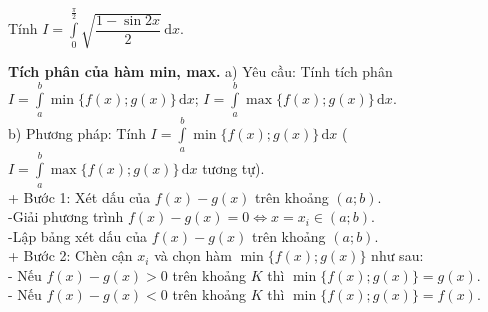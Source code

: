 \begin{ex}%
	Tính $I=\displaystyle\int\limits_0^{\tfrac{\pi}{2}}\sqrt{\dfrac{1-\sin 2x}{2}}\mathrm{\,d}x$.
\end{ex}
\textbf{Tích phân của hàm min, max.}
a) Yêu cầu: Tính tích phân $I=\displaystyle\int\limits_a^b\min\{f(x);g(x)\}\mathrm{\,d}x$; $I=\displaystyle\int\limits_a^b\max\{f(x);g(x)\}\mathrm{\,d}x$.\\
b) Phương pháp: Tính $I=\displaystyle\int\limits_a^b\min\{f(x);g(x)\}\mathrm{\,d}x$ ($I=\displaystyle\int\limits_a^b\max\{f(x);g(x)\}\mathrm{\,d}x$ tương tự).\\
+ Bước 1: Xét dấu của $f(x)-g(x)$ trên khoảng $(a;b)$.\\
-Giải phương trình $f(x)-g(x)=0\Leftrightarrow x=x_i\in(a;b)$.\\
-Lập bảng xét dấu của $f(x)-g(x)$ trên khoảng $(a;b)$.\\
+ Bước 2: Chèn cận $x_i$ và chọn hàm $\min\{f(x);g(x)\}$ như sau:\\
- Nếu $f(x)-g(x)>0$ trên khoảng $K$ thì $\min\{f(x);g(x)\}=g(x)$.\\
- Nếu $f(x)-g(x)<0$ trên khoảng $K$ thì $\min\{f(x);g(x)\}=f(x)$.\\
